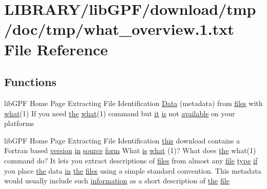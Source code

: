 \hypertarget{what__overview_81_8txt}{}\section{L\+I\+B\+R\+A\+R\+Y/lib\+G\+P\+F/download/tmp/doc/tmp/what\+\_\+overview.1.txt File Reference}
\label{what__overview_81_8txt}
\subsection*{Functions}
\begin{DoxyCompactItemize}
\item 
lib\+G\+PF Home Page Extracting File Identification \hyperlink{what__overview_81_8txt_a7483c2b9bbf430d46a9822c512d71bea}{Data} (metadata) from \hyperlink{ufpp__overview_81_8txt_a5673f2294ff1627be40c90eae33141ca}{files} with \hyperlink{what__overview_81_8txt_a8cdf8efd1b900d6dce77a3f97edb2216}{what}(1) If you need \hyperlink{M__stopwatch_83_8txt_a0f266597de2e57eb3aa964927bb30e14}{the} \hyperlink{what__overview_81_8txt_a8cdf8efd1b900d6dce77a3f97edb2216}{what}(1) command but \hyperlink{what__overview_81_8txt_a1468cf345691ca45f70578e0b7abd264}{it} \hyperlink{intro__blas1_83_8txt_a42a91df93f840595de3019ceb5d1df23}{is} not \hyperlink{M__stopwatch_83_8txt_ab4765d078d076a26632c886ad3875761}{available} on your platforms
\item 
lib\+G\+PF Home Page Extracting File Identification \hyperlink{M__stopwatch_83_8txt_ad62a52042bb610eee5b36b5516caec22}{this} download contains a Fortran based \hyperlink{inquiry__stopwatch_83_8txt_aee378be19d20935dd436517beda00ee4}{version} \hyperlink{M__journal_83_8txt_afce72651d1eed785a2132bee863b2f38}{in} \hyperlink{ufpp__overview_81_8txt_a4d6669ece605d05985c83a04dd38e0ad}{source} \hyperlink{what__overview_81_8txt_ab6ccd3cf736f24d661599d9ce944e9bf}{form} What \hyperlink{intro__blas1_83_8txt_a42a91df93f840595de3019ceb5d1df23}{is} \hyperlink{what__overview_81_8txt_a8cdf8efd1b900d6dce77a3f97edb2216}{what} (1)? What does \hyperlink{M__stopwatch_83_8txt_a0f266597de2e57eb3aa964927bb30e14}{the} what(1) command do? It lets you extract descriptions of \hyperlink{ufpp__overview_81_8txt_a5673f2294ff1627be40c90eae33141ca}{files} from almost any \hyperlink{what__overview_81_8txt_a447b56c526e8da30e0dc94673727ee25}{file} \hyperlink{stop__watch_83_8txt_a70f0ead91c32e25323c03265aa302c1c}{type} \hyperlink{exit_87_8txt_a77395982f8d25581c808c40f3b634d90}{if} you place \hyperlink{M__stopwatch_83_8txt_a0f266597de2e57eb3aa964927bb30e14}{the} data \hyperlink{M__journal_83_8txt_afce72651d1eed785a2132bee863b2f38}{in} \hyperlink{M__stopwatch_83_8txt_a0f266597de2e57eb3aa964927bb30e14}{the} \hyperlink{ufpp__overview_81_8txt_a5673f2294ff1627be40c90eae33141ca}{files} using a simple standard convention. This metadata would usually include such \hyperlink{M__stopwatch_83_8txt_a9f7f0ce21871efda7da3eda76d1d3cff}{information} as a short description of \hyperlink{M__stopwatch_83_8txt_a0f266597de2e57eb3aa964927bb30e14}{the} \hyperlink{what__overview_81_8txt_a447b56c526e8da30e0dc94673727ee25}{file}

\end{DoxyCompactItemize}
